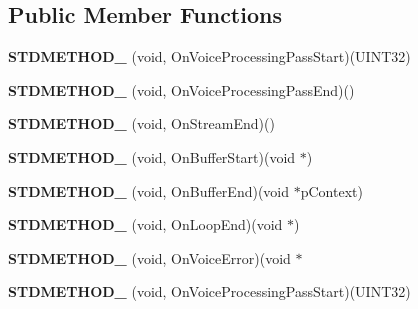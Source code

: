 \subsection*{Public Member Functions}
\begin{DoxyCompactItemize}
\item 
\mbox{\label{structStreamingVoiceContext_a95ce0a0aa4cceecbd0448801a01c46e0}} 
{\bfseries S\+T\+D\+M\+E\+T\+H\+O\+D\+\_\+} (void, On\+Voice\+Processing\+Pass\+Start)(U\+I\+N\+T32)
\item 
\mbox{\label{structStreamingVoiceContext_a9b94bfe00fc901fbe5a3c828c33ef42d}} 
{\bfseries S\+T\+D\+M\+E\+T\+H\+O\+D\+\_\+} (void, On\+Voice\+Processing\+Pass\+End)()
\item 
\mbox{\label{structStreamingVoiceContext_a5f23ec1e8cd3d63285a90c4f572c1882}} 
{\bfseries S\+T\+D\+M\+E\+T\+H\+O\+D\+\_\+} (void, On\+Stream\+End)()
\item 
\mbox{\label{structStreamingVoiceContext_ae80b03490f9f7f88a9e4a708a5abb9f3}} 
{\bfseries S\+T\+D\+M\+E\+T\+H\+O\+D\+\_\+} (void, On\+Buffer\+Start)(void $\ast$)
\item 
\mbox{\label{structStreamingVoiceContext_a25babd4be50837b73e1c39d9bd06c2f3}} 
{\bfseries S\+T\+D\+M\+E\+T\+H\+O\+D\+\_\+} (void, On\+Buffer\+End)(void $\ast$p\+Context)
\item 
\mbox{\label{structStreamingVoiceContext_a3f49c526b8dd5f37100fd0ae91b46aac}} 
{\bfseries S\+T\+D\+M\+E\+T\+H\+O\+D\+\_\+} (void, On\+Loop\+End)(void $\ast$)
\item 
\mbox{\label{structStreamingVoiceContext_a89a0700ff14cc9c6349f9416f27ff013}} 
{\bfseries S\+T\+D\+M\+E\+T\+H\+O\+D\+\_\+} (void, On\+Voice\+Error)(void $\ast$
\item 
\mbox{\label{structStreamingVoiceContext_a95ce0a0aa4cceecbd0448801a01c46e0}} 
{\bfseries S\+T\+D\+M\+E\+T\+H\+O\+D\+\_\+} (void, On\+Voice\+Processing\+Pass\+Start)(U\+I\+N\+T32)
\item 

\end{DoxyCompactItemize}
